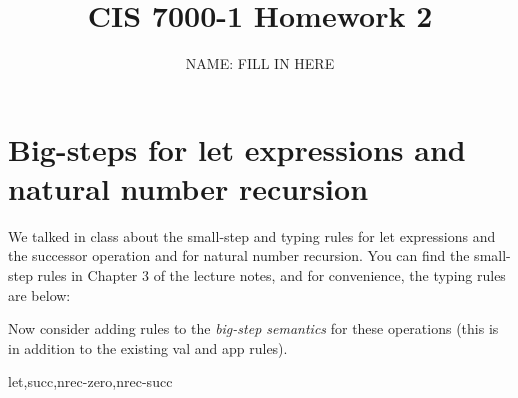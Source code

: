 \documentclass{article}
\title{CIS 7000-1 Homework 2}
\author{NAME: FILL IN HERE}
\theoremstyle{definition}
\begin{document}
\maketitle

\newcommand\answer[1]{}

\section{Big-steps for let expressions and natural number recursion}

We talked in class about the small-step and typing rules for let expressions
and the successor operation and for natural number recursion. You can find the
small-step rules in Chapter 3 of the lecture notes, and for convenience, the
typing rules are below:


Now consider adding rules to the \emph{big-step semantics} for these
operations (this is in addition to the existing val and app rules).

{let,succ,nrec-zero,nrec-succ}
\end{document}
